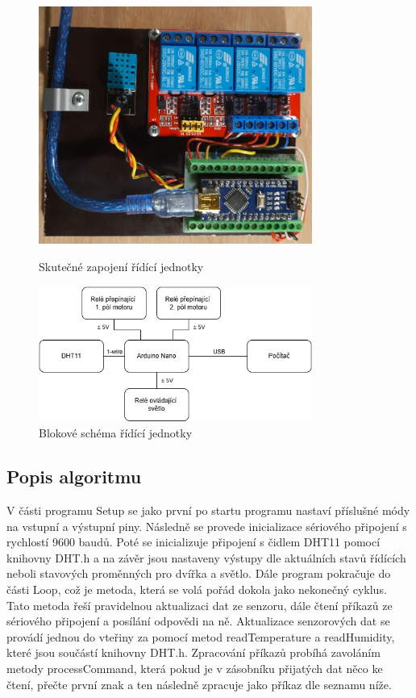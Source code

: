 \begin{figure}[htbp]
    \centering
    \begin{minipage}[b]{0.45\textwidth}
        \centering
        \includegraphics[width=0.8\textwidth]{img/ridici_jednotka}
        \caption{Skutečné zapojení řídící jednotky}
        \label{fig:ridici_jednotka}
    \end{minipage}
    \hfill
    \begin{minipage}[b]{0.45\textwidth}
        \centering
        \includegraphics[width=0.8\textwidth]{img/schema_ridici_jednotky}
        \caption{Blokové schéma řídící jednotky}
        \label{fig:schema_ridici_jednotky}
    \end{minipage}
\end{figure}

\subsection*{Popis algoritmu}
V části programu Setup se jako první po startu programu nastaví příslušné módy na vstupní a výstupní piny.
Následně se provede inicializace sériového připojení s rychlostí 9600 baudů.
Poté se inicializuje připojení s čidlem DHT11 pomocí knihovny DHT.h a na závěr jsou nastaveny výstupy dle aktuálních stavů řídících neboli stavových proměnných pro dvířka a světlo.
Dále program pokračuje do části Loop, což je metoda, která se volá pořád dokola jako nekonečný cyklus.
Tato metoda řeší pravidelnou aktualizaci dat ze senzoru, dále čtení příkazů ze sériového připojení a posílání odpovědi na ně.
Aktualizace senzorových dat se provádí jednou do vteřiny za pomocí metod readTemperature a readHumidity, které jsou součástí knihovny DHT.h.
Zpracování příkazů probíhá zavoláním metody processCommand, která pokud je v zásobníku přijatých dat něco ke čtení, přečte první znak a ten následně zpracuje jako příkaz dle seznamu níže.


